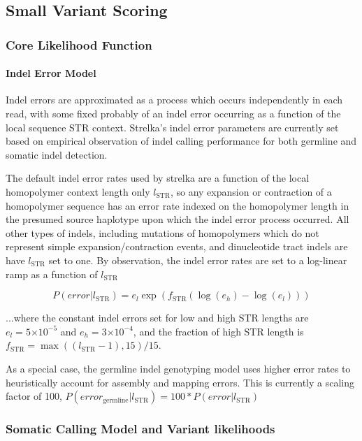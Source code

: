 \documentclass{article}
\newcommand{\e}[1]{\ensuremath{\times 10^{#1}}}
\begin{document}
\subsection{Small Variant Scoring}

\subsubsection{Core Likelihood Function}

\paragraph{Indel Error Model}

Indel errors are approximated as a process which occurs independently in each read, with some fixed probably of an indel error occurring as a function of the local sequence STR context. Strelka's indel error parameters are currently set based on empirical observation of indel calling performance for both germline and somatic indel detection.

The default indel error rates used by strelka are a function of the local homopolymer context length only $l_{\text{STR}}$, so any expansion or contraction of a homopolymer sequence has an error rate indexed on the homopolymer length in the presumed source haplotype upon which the indel error process occurred. All other types of indels, including mutations of homopolymers which do not represent simple expansion/contraction events, and dinucleotide tract indels are have $l_{\text{STR}}$ set to one. By observation, the indel error rates are set to a log-linear ramp as a function of $l_{\text{STR}}$

\begin{equation*}
P(error | l_{\text{STR}}) = e_{l} \exp(f_{\text{STR}}(\log(e_{h})-\log(e_{l})))
\end{equation*}

\noindent ...where the constant indel errors set for low and high STR lengths are $e_{l} = 5\e{-5}$ and $e_{h} = 3\e{-4}$, and the fraction of high STR length is $f_{\text{STR}} = \max((l_{\text{STR}}-1),15)/15$.

As a special case, the germline indel genotyping model uses higher error rates to heuristically account for assembly and mapping errors. This is currently a scaling factor of 100, $P(error_{\text{germline}} | l_{\text{STR}}) = 100 * P(error | l_{\text{STR}})$


\subsubsection{Somatic Calling Model and Variant likelihoods}
\end{document}
